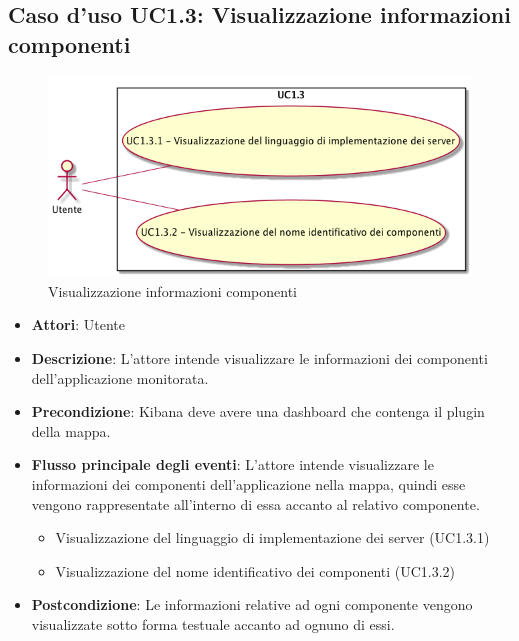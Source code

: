 \subsection{Caso d'uso UC1.3: Visualizzazione informazioni componenti}
\begin{figure} [H]
\centering
\includegraphics[scale=0.45]{./UC/UC1-3.png}
\caption{Visualizzazione informazioni componenti}\label{}
\end{figure}
\begin{itemize}
\item \textbf{Attori}: Utente
\item \textbf{Descrizione}: L'attore intende visualizzare le informazioni dei componenti dell'applicazione monitorata.
\item \textbf{Precondizione}: Kibana deve avere una dashboard che contenga il plugin della mappa.
\item \textbf{Flusso principale degli eventi}: L'attore intende visualizzare le informazioni dei componenti dell'applicazione nella mappa, quindi esse vengono rappresentate all'interno di essa accanto al relativo componente.
\begin{itemize}
\item Visualizzazione del linguaggio di implementazione dei server (UC1.3.1)
\item Visualizzazione del nome identificativo dei componenti (UC1.3.2)
\end{itemize}
\item \textbf{Postcondizione}: Le informazioni relative ad ogni componente vengono visualizzate sotto forma testuale accanto ad ognuno di essi.
\end{itemize}
